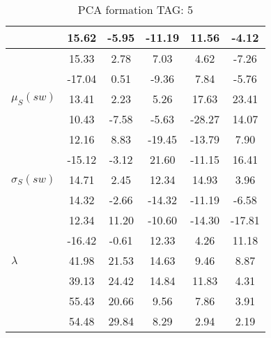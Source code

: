 \begin{table}[h!]
\begin{center}
\begin{tabular}{| l | c | c | c | c | c |}
 & 15.62  & -5.95  & -11.19  & 11.56  & -4.12 \\\hline
 & 15.33  & 2.78  & 7.03  & 4.62  & -7.26 \\\hline
 & -17.04  & 0.51  & -9.36  & 7.84  & -5.76 \\\hline
$\mu_S(sw)$ & 13.41  & 2.23  & 5.26  & 17.63  & 23.41 \\\hline
 & 10.43  & -7.58  & -5.63  & -28.27  & 14.07 \\\hline
 & 12.16  & 8.83  & -19.45  & -13.79  & 7.90 \\\hline
 & -15.12  & -3.12  & 21.60  & -11.15  & 16.41 \\\hline
$\sigma_S(sw)$ & 14.71  & 2.45  & 12.34  & 14.93  & 3.96 \\\hline
 & 14.32  & -2.66  & -14.32  & -11.19  & -6.58 \\\hline
 & 12.34  & 11.20  & -10.60  & -14.30  & -17.81 \\\hline
 & -16.42  & -0.61  & 12.33  & 4.26  & 11.18 \\\hline
$\lambda$ & 41.98  & 21.53  & 14.63  & 9.46  & 8.87 \\\hline
 & 39.13  & 24.42  & 14.84  & 11.83  & 4.31 \\\hline
 & 55.43  & 20.66  & 9.56  & 7.86  & 3.91 \\\hline
 & 54.48  & 29.84  & 8.29  & 2.94  & 2.19 \\\hline
\end{tabular}
\caption{PCA formation TAG: 5}
\end{center}
\end{table}